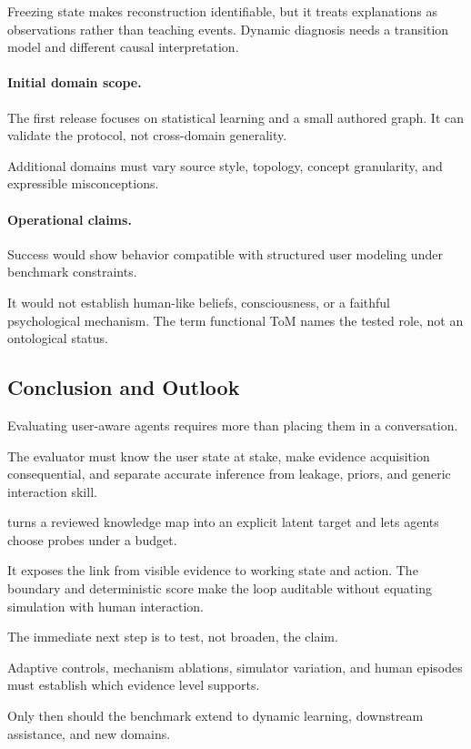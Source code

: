 Freezing state makes reconstruction identifiable, but it treats explanations as observations rather
than teaching events. Dynamic diagnosis needs a transition model and different causal interpretation.

\paragraph{Initial domain scope.}
The first release focuses on statistical learning and a small authored graph. It can validate the
protocol, not cross-domain generality.

Additional domains must vary source style, topology, concept granularity, and expressible misconceptions.

\paragraph{Operational claims.}
Success would show behavior compatible with structured user modeling under benchmark constraints.

It would not establish human-like beliefs, consciousness, or a faithful psychological mechanism. The
term functional ToM names the tested role, not an ontological status.

\subsection{Conclusion and Outlook}

Evaluating user-aware agents requires more than placing them in a conversation.

The evaluator must know the user state at stake, make evidence acquisition consequential, and separate
accurate inference from leakage, priors, and generic interaction skill.

\knowact turns a reviewed knowledge map into an explicit latent target and lets agents choose probes
under a budget.

It exposes the link from visible evidence to working state and action. The \sagesim boundary and
deterministic score make the loop auditable without equating simulation with human interaction.

The immediate next step is to test, not broaden, the claim.

Adaptive controls, mechanism ablations, simulator variation, and human episodes must establish which
evidence level \knowact supports.

Only then should the benchmark extend to dynamic learning, downstream assistance, and new domains.
